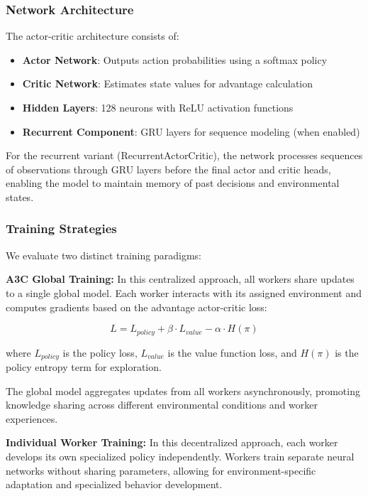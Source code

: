\subsubsection{Network Architecture}

The actor-critic architecture consists of:
\begin{itemize}
\item \textbf{Actor Network}: Outputs action probabilities using a softmax policy
\item \textbf{Critic Network}: Estimates state values for advantage calculation
\item \textbf{Hidden Layers}: 128 neurons with ReLU activation functions
\item \textbf{Recurrent Component}: GRU layers for sequence modeling (when enabled)
\end{itemize}

For the recurrent variant (RecurrentActorCritic), the network processes sequences of observations through GRU layers before the final actor and critic heads, enabling the model to maintain memory of past decisions and environmental states.

\subsubsection{Training Strategies}

We evaluate two distinct training paradigms:

\textbf{A3C Global Training:} In this centralized approach, all workers share updates to a single global model. Each worker interacts with its assigned environment and computes gradients based on the advantage actor-critic loss:

\begin{equation}
L = L_{policy} + \beta \cdot L_{value} - \alpha \cdot H(\pi)
\end{equation}

where $L_{policy}$ is the policy loss, $L_{value}$ is the value function loss, and $H(\pi)$ is the policy entropy term for exploration.

The global model aggregates updates from all workers asynchronously, promoting knowledge sharing across different environmental conditions and worker experiences.

\textbf{Individual Worker Training:} In this decentralized approach, each worker develops its own specialized policy independently. Workers train separate neural networks without sharing parameters, allowing for environment-specific adaptation and specialized behavior development.


